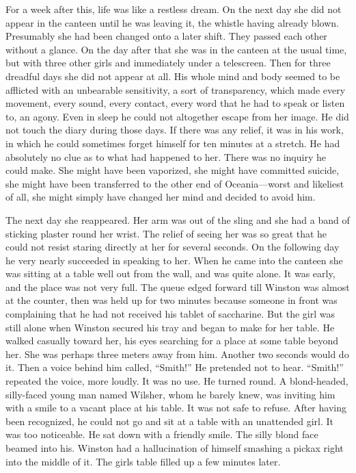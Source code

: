 For a week after this, life was like a restless dream. On the next day
she did not appear in the canteen until he was leaving it, the whistle
having already blown. Presumably she had been changed onto a later
shift. They passed each other without a glance. On the day after that
she was in the canteen at the usual time, but with three other girls and
immediately under a telescreen. Then for three dreadful days she did not
appear at all. His whole mind and body seemed to be afflicted with an
unbearable sensitivity, a sort of transparency, which made every
movement, every sound, every contact, every word that he had to speak or
listen to, an agony. Even in sleep he could not altogether escape from
her image. He did not touch the diary during those days. If there was
any relief, it was in his work, in which he could sometimes forget
himself for ten minutes at a stretch. He had absolutely no clue as to
what had happened to her. There was no inquiry he could make. She might
have been vaporized, she might have committed suicide, she might have
been transferred to the other end of Oceania---worst and likeliest of
all, she might simply have changed her mind and decided to avoid him.

The next day she reappeared. Her arm was out of the sling and she had a
band of sticking plaster round her wrist. The relief of seeing her was
so great that he could not resist staring directly at her for several
seconds. On the following day he very nearly succeeded in speaking to
her. When he came into the canteen she was sitting at a table well out
from the wall, and was quite alone. It was early, and the place was not
very full. The queue edged forward till Winston was almost at the
counter, then was held up for two minutes because someone in front was
complaining that he had not received his tablet of saccharine. But the
girl was still alone when Winston secured his tray and began to make for
her table. He walked casually toward her, his eyes searching for a place
at some table beyond her. She was perhaps three meters away from him.
Another two seconds would do it. Then a voice behind him called,
``Smith!'' He pretended not to hear. ``Smith!'' repeated the voice, more
loudly. It was no use. He turned round. A blond-headed, silly-faced
young man named Wilsher, whom he barely knew, was inviting him with a
smile to a vacant place at his table. It was not safe to refuse. After
having been recognized, he could not go and sit at a table with an
unattended girl. It was too noticeable. He sat down with a friendly
smile. The silly blond face beamed into his. Winston had a hallucination
of himself smashing a pickax right into the middle of it. The
girl\textquotesingle s table filled up a few minutes later.

